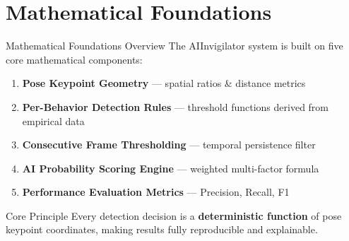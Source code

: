 \documentclass{beamer}
\begin{document}
\section{Mathematical Foundations}

\begin{frame}{Mathematical Foundations Overview}
The AIInvigilator system is built on five core mathematical components:
\begin{enumerate}
    \item \textbf{Pose Keypoint Geometry} --- spatial ratios \& distance metrics
    \item \textbf{Per-Behavior Detection Rules} --- threshold functions derived from empirical data
    \item \textbf{Consecutive Frame Thresholding} --- temporal persistence filter
    \item \textbf{AI Probability Scoring Engine} --- weighted multi-factor formula
    \item \textbf{Performance Evaluation Metrics} --- Precision, Recall, F1
\end{enumerate}
\vspace{0.4cm}
\begin{block}{Core Principle}
Every detection decision is a \textbf{deterministic function} of pose keypoint coordinates, making results fully reproducible and explainable.
\end{block}
\end{frame}
\end{document}
